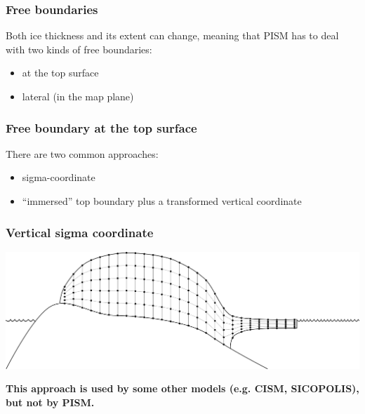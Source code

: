 \documentclass[hide notes,intlimits]{beamer}
\begin{document}
\begin{frame}
  \frametitle{Free boundaries}
  Both ice thickness and its extent can change, meaning that PISM has
  to deal with two kinds of free boundaries:

  \begin{itemize}
  \item at the top surface
  \item lateral (in the map plane)
  \end{itemize}
\end{frame}


\begin{frame}
  \frametitle{Free boundary at the top surface}
  There are two common approaches:
  \begin{itemize}
  \item sigma-coordinate
  \item ``immersed'' top boundary plus a transformed vertical
    coordinate
  \end{itemize}
\end{frame}

\begin{frame}
  \frametitle{Vertical sigma coordinate}
  \begin{center}
    \includegraphics[width=\linewidth]{grid-vertical-sigma}

    \textbf{This approach is used by some other models (e.g. CISM,
      SICOPOLIS), but not by PISM.}
  \end{center}
\end{frame}
\end{document}
